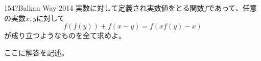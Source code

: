 \begin{thm}{154}{\hosi ?}{Balkan Way 2014}
 実数に対して定義され実数値をとる関数$f$であって、任意の実数$x, y$に対して
 \[ f\left(f(y)\right)+f(x-y)=f\left(xf(y)-x\right) \]
 が成り立つようなものを全て求めよ。
\end{thm}

ここに解答を記述。